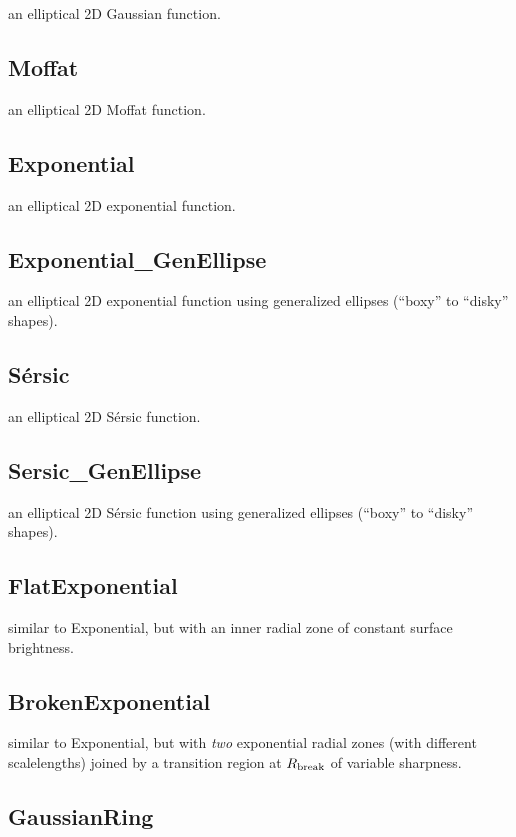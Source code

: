 \documentclass[10pt]{article}
\begin{document}
an elliptical 2D Gaussian function.


\subsection{Moffat}

an elliptical 2D Moffat function.


\subsection{Exponential}

an elliptical 2D exponential function.


\subsection{Exponential\_GenEllipse}

an elliptical 2D exponential function using generalized ellipses (``boxy'' to ``disky'' shapes).

\subsection{S\'ersic}

an elliptical 2D S\'ersic function.


\subsection{Sersic\_GenEllipse}
an elliptical 2D S\'ersic function using
generalized ellipses (``boxy'' to ``disky'' shapes).


\subsection{FlatExponential} 

similar to Exponential, but with an inner radial zone
of constant surface brightness.


\subsection{BrokenExponential}

similar to Exponential, but with \textit{two}
exponential radial zones (with different scalelengths) joined by a transition region
at $R_{\rm break}$ of variable sharpness.


\subsection{GaussianRing}
\end{document}
